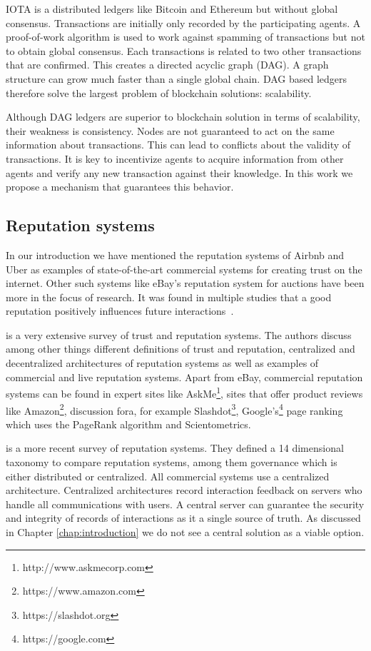 IOTA\cite{popov2016tangle} is a distributed ledgers like Bitcoin and Ethereum but without global 
consensus. Transactions are initially only recorded by the participating agents. A proof-of-work 
algorithm is used to work against spamming of transactions but not to obtain global consensus. Each
transactions is related to two other transactions that are confirmed. This creates a directed 
acyclic graph (DAG). A graph structure can grow much faster than a single global chain. DAG based 
ledgers therefore solve the largest problem of blockchain solutions: scalability.

Although DAG ledgers are superior to blockchain solution in terms of scalability, their weakness is
consistency. Nodes are not guaranteed to act on the same information about transactions. This can 
lead to conflicts about the validity of transactions. It is key to incentivize agents to acquire 
information from other agents and verify any new transaction against their knowledge. In this work
we propose a mechanism that guarantees this behavior.

\subsection{Reputation systems}
In our introduction we have mentioned the reputation systems of Airbnb and Uber as examples of 
state-of-the-art commercial systems for creating trust on the internet. Other such systems like 
eBay's reputation system for auctions have been more in the focus of research. It was found in 
multiple studies that a good reputation positively influences future interactions~\cite{resnick2002trust, houser2006reputation, dewan2004adverse}.

\cite{josang2007survey} is a very extensive survey of trust and reputation systems. The authors 
discuss among other things different definitions of trust and reputation, centralized and decentralized architectures 
of reputation systems as well as examples of commercial and live reputation systems. Apart from 
eBay, commercial reputation systems can be found in expert sites like AskMe\footnote{http://www.askmecorp.com},
sites that offer product reviews like Amazon\footnote{https://www.amazon.com}, discussion fora, 
for example Slashdot\footnote{https://slashdot.org}, Google's\footnote{https://google.com} page ranking which uses the PageRank
algorithm\cite{page1999pagerank} and Scientometrics. 

\cite{HENDRIKX2015184} is a more recent survey of reputation systems. They defined a 14 dimensional
taxonomy to compare reputation systems, among them governance which is either distributed or 
centralized. All commercial systems use a centralized
architecture. Centralized architectures record interaction feedback on servers who handle all 
communications with users. A central server can guarantee the security and integrity of records of
interactions as it a single source of truth. As discussed in Chapter \ref{chap:introduction} we do
not see a central solution as a viable option. 

